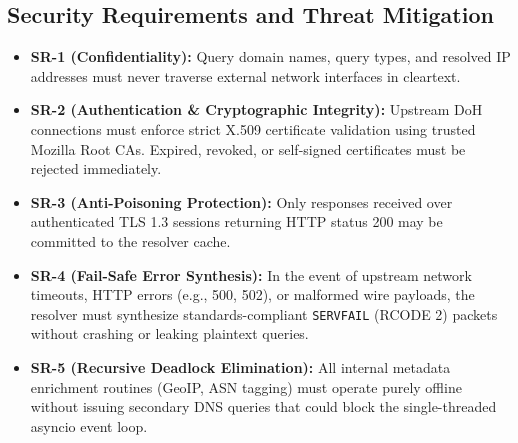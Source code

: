 \documentclass[10pt,a4paper]{article}
\begin{document}
\subsection{Security Requirements and Threat Mitigation}
\begin{itemize}\itemsep 1pt
    \item \textbf{SR-1 (Confidentiality):} Query domain names, query types, and resolved IP addresses must never traverse external network interfaces in cleartext.
    \item \textbf{SR-2 (Authentication \& Cryptographic Integrity):} Upstream DoH connections must enforce strict X.509 certificate validation using trusted Mozilla Root CAs. Expired, revoked, or self-signed certificates must be rejected immediately.
    \item \textbf{SR-3 (Anti-Poisoning Protection):} Only responses received over authenticated TLS 1.3 sessions returning HTTP status 200 may be committed to the resolver cache.
    \item \textbf{SR-4 (Fail-Safe Error Synthesis):} In the event of upstream network timeouts, HTTP errors (e.g., 500, 502), or malformed wire payloads, the resolver must synthesize standards-compliant \texttt{SERVFAIL} (RCODE 2) packets without crashing or leaking plaintext queries.
    \item \textbf{SR-5 (Recursive Deadlock Elimination):} All internal metadata enrichment routines (GeoIP, ASN tagging) must operate purely offline without issuing secondary DNS queries that could block the single-threaded asyncio event loop.
\end{itemize}
\end{document}
